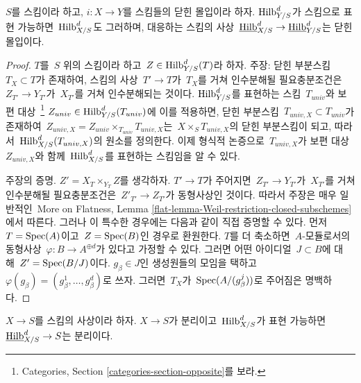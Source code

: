 \begin{lemma}
\label{lemma-hilb-d-of-closed}
$S$를 스킴이라 하고, $i : X \to Y$를 스킴들의 닫힌 몰입이라 하자.
$\mathrm{Hilb}^d_{Y/S}$가 스킴으로 표현 가능하면\ 
$\mathrm{Hilb}^d_{X/S}$도 그러하며, 대응하는 스킴의 사상\ 
$\underline{\mathrm{Hilb}}^d_{X/S} \to \underline{\mathrm{Hilb}}^d_{Y/S}$는
닫힌 몰입이다.
\end{lemma}

\begin{proof}
$T$를\  $S$ 위의 스킴이라 하고\  $Z \in \mathrm{Hilb}^d_{Y/S}(T)$라 하자.
주장: 닫힌 부분스킴\  $T_X \subset T$가 존재하여, 스킴의 사상\ 
$T' \to T$가\  $T_X$를 거쳐 인수분해될 필요충분조건은\ 
$Z_{T'} \to Y_{T'}$가\  $X_{T'}$를 거쳐 인수분해되는 것이다.
$\mathrm{Hilb}^d_{Y/S}$를 표현하는 스킴\  $T_{univ}$와 보편 대상\ 
\footnote{Categories, Section \ref{categories-section-opposite}를 보라.}
$Z_{univ} \in \mathrm{Hilb}^d_{Y/S}(T_{univ})$에 이를 적용하면,
닫힌 부분스킴\  $T_{univ, X} \subset T_{univ}$가 존재하여\ 
$Z_{univ, X} = Z_{univ} \times_{T_{univ}} T_{univ, X}$는\ 
$X \times_S T_{univ, X}$의 닫힌 부분스킴이 되고, 따라서\ 
$\mathrm{Hilb}^d_{X/S}(T_{univ, X})$의 원소를 정의한다.
이제 형식적 논증으로\  $T_{univ, X}$가 보편 대상\  $Z_{univ, X}$와 함께\ 
$\mathrm{Hilb}^d_{X/S}$를 표현하는 스킴임을 알 수 있다.

\medskip\noindent
주장의 증명. $Z' = X_T \times_{Y_T} Z$를 생각하자. $T' \to T$가
주어지면\  $Z_{T'} \to Y_{T'}$가\  $X_{T'}$를 거쳐 인수분해될 필요충분조건은\ 
$Z'_{T'} \to Z_{T'}$가 동형사상인 것이다. 따라서 주장은 매우 일반적인\ 
More on Flatness, Lemma \ref{flat-lemma-Weil-restriction-closed-subschemes}에서
따른다. 그러나 이 특수한 경우에는 다음과 같이 직접 증명할 수 있다.
먼저\  $T = \mathop{\mathrm{Spec}}(A)$이고\  $Z = \mathop{\mathrm{Spec}}(B)$인 경우로 환원한다.
$T$를 더 축소하면\  $A$-모듈로서의 동형사상\ 
$\varphi : B \to A^{\oplus d}$가 있다고 가정할 수 있다. 그러면 어떤 아이디얼\ 
$J \subset B$에 대해\  $Z' = \mathop{\mathrm{Spec}}(B/J)$이다. $g_\beta \in J$인 생성원들의
모임을 택하고\  $\varphi(g_\beta) = (g_\beta^1, \ldots, g_\beta^d)$로 쓰자.
그러면\  $T_X$가\  $\mathop{\mathrm{Spec}}(A/(g_\beta^j))$로 주어짐은 명백하다.
\end{proof}

\begin{lemma}
\label{lemma-hilb-d-separated}
$X \to S$를 스킴의 사상이라 하자. $X \to S$가 분리이고\ 
$\mathrm{Hilb}^d_{X/S}$가 표현 가능하면\ 
$\underline{\mathrm{Hilb}}^d_{X/S} \to S$는 분리이다.
\end{lemma}

